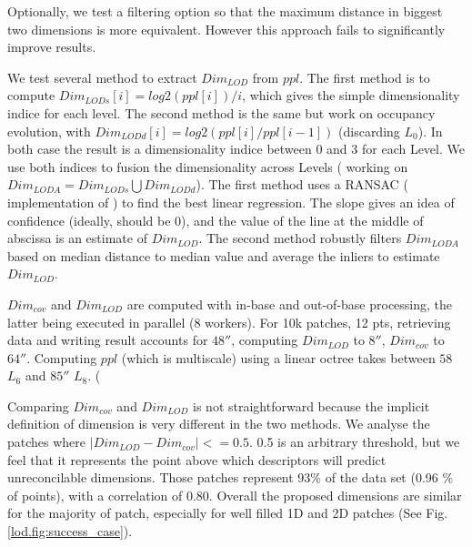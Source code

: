 		Optionally, we test a filtering option so that the maximum distance in biggest two dimensions is more equivalent. However this approach fails to significantly improve results.
		
		We test several method to extract $Dim_{LOD}$ from $ppl$.
		The first method is to compute $ Dim_{LODs}[i] = log2(ppl[i])/i$,
		which gives the simple dimensionality indice for each level.
		The second method is the same but work on occupancy evolution, with
		$Dim_{LODd}[i] = log2(ppl[i]/ppl[i-1])$ (discarding $L_0$).
		In both case the result is a dimensionality indice between 0 and 3 for each Level.
		We use both indices to fusion the dimensionality across Levels (  working on $Dim_{LODA} = Dim_{LODs}\bigcup Dim_{LODd}$).
		The first method uses a RANSAC (\cite{SciPy2014} implementation of \cite{Choi2009}) 
		to find the best linear regression. The slope gives an idea of confidence (ideally, should be 0),
		and the value of the line at the middle of abscissa is an estimate of $Dim_{LOD}$.
		The second method robustly filters $Dim_{LODA}$ based on median distance to median value and
		average the inliers to estimate $Dim_{LOD}$.
		
		$Dim_{cov}$ and $Dim_{LOD}$ are computed with in-base and out-of-base processing, the latter 
		being executed in parallel (8 workers).
		For 10k patches, 12 \mega pts, retrieving data and writing result accounts for $48\second$, computing $Dim_{LOD}$ to $8\second$, $Dim_{cov}$ to $64\second$. Computing $ppl$ (which is multiscale) using a linear octree takes between $58$ $L_6$ and $85 \second$ $L_8$.
		 (
		
		
		Comparing $Dim_{cov}$ and $Dim_{LOD}$ is not straightforward because the implicit definition of dimension is very different in the two methods.
		We analyse the patches where $\lvert Dim_{LOD} -  Dim_{cov}\rvert <=0.5$. 
		0.5 is an arbitrary threshold,
		but we feel that it represents the point above which descriptors will predict unreconcilable dimensions.
		Those patches represent 93\% of the data set (0.96 \% of points), with a correlation of 0.80.
		Overall the proposed dimensions are similar for the majority of patch, especially for well filled 1D and 2D patches (See Fig. \ref{lod.fig:success_case}).
		

